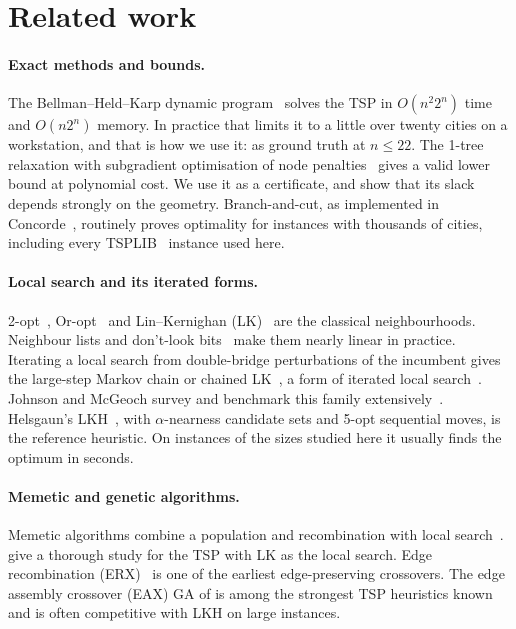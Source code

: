 \section{Related work}\label{sec:related}

\paragraph{Exact methods and bounds.}
The Bellman--Held--Karp dynamic program~\citep{bellman1962,heldkarp1962} solves the TSP in
$O(n^2 2^n)$ time and $O(n2^n)$ memory. In practice that limits it to a little over twenty cities on a
workstation, and that is how we use it: as ground truth at $n\le 22$. The 1-tree relaxation with
subgradient optimisation of node penalties~\citep{heldkarp1970,heldkarp1971} gives a valid lower bound
at polynomial cost. We use it as a certificate, and show that its slack depends strongly on the
geometry. Branch-and-cut, as implemented in Concorde~\citep{applegate2006}, routinely proves
optimality for instances with thousands of cities, including every TSPLIB~\citep{reinelt1991} instance
used here.

\paragraph{Local search and its iterated forms.}
2-opt~\citep{croes1958}, Or-opt~\citep{or1976} and Lin--Kernighan (LK)~\citep{lin1973} are the classical
neighbourhoods. Neighbour lists and don't-look bits~\citep{bentley1992} make them nearly linear in
practice. Iterating a local search from double-bridge perturbations of the incumbent gives the
large-step Markov chain or chained LK~\citep{martin1991}, a form of iterated local
search~\citep{lourenco2003}. Johnson and McGeoch survey and benchmark this family
extensively~\citep{johnson1997,johnson2002}. Helsgaun's LKH~\citep{helsgaun2000,helsgaun2009,helsgaun2017},
with $\alpha$-nearness candidate sets and 5-opt sequential moves, is the reference heuristic. On
instances of the sizes studied here it usually finds the optimum in seconds.

\paragraph{Memetic and genetic algorithms.}
Memetic algorithms combine a population and recombination with local search~\citep{moscato1989}.
\citet{merz2001} give a thorough study for the TSP with LK as the local search. Edge recombination
(ERX)~\citep{whitley1989} is one of the earliest edge-preserving crossovers. The edge assembly crossover
(EAX) GA of \citet{nagata2013} is among the strongest TSP heuristics known and is often competitive with
LKH on large instances.

